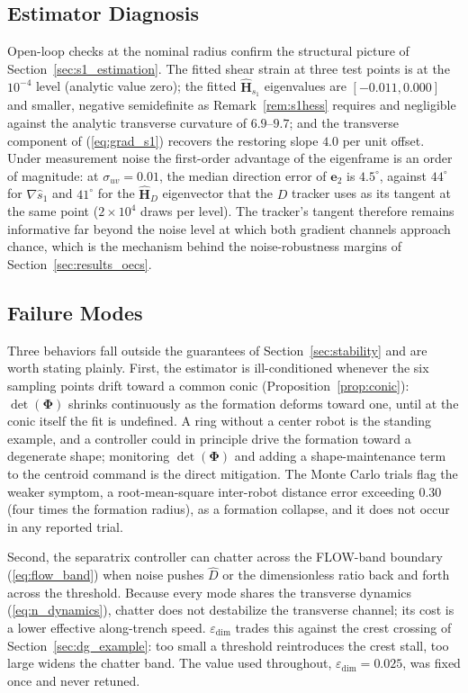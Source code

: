 \documentclass[lettersize,journal]{IEEEtran}
\begin{document}
\subsection{Estimator Diagnosis}
\label{sec:estimator_diagnosis}

Open-loop checks at the nominal radius confirm the structural picture
of Section~\ref{sec:s1_estimation}. The fitted shear strain at three
test points is at the $10^{-4}$ level (analytic value zero); the fitted
$\hat{\mathbf{H}}_{s_1}$ eigenvalues are $[-0.011, 0.000]$ and smaller,
negative semidefinite as Remark~\ref{rem:s1hess} requires and
negligible against the analytic transverse curvature of $6.9$--$9.7$;
and the transverse component of (\ref{eq:grad_s1}) recovers the
restoring slope $4.0$ per unit offset. Under measurement noise the
first-order advantage of the eigenframe is an order of magnitude: at
$\sigma_{uv} = 0.01$, the median direction error of $\mathbf{e}_2$ is
$4.5^\circ$, against $44^\circ$ for $\nabla\hat{s}_1$ and $41^\circ$
for the $\hat{\mathbf{H}}_D$ eigenvector that the $D$ tracker uses as its
tangent at the same point ($2\times 10^4$ draws per level). The
tracker's tangent therefore remains informative far beyond the noise
level at which both gradient channels approach chance, which is the
mechanism behind the noise-robustness margins of
Section~\ref{sec:results_oecs}.

\subsection{Failure Modes}

Three behaviors fall outside the guarantees of
Section~\ref{sec:stability} and are worth stating plainly. First, the
estimator is ill-conditioned whenever the six sampling points drift
toward a common conic (Proposition~\ref{prop:conic}):
$\det(\boldsymbol{\Phi})$ shrinks continuously as the formation
deforms toward one, until at the conic itself the fit is undefined. A
ring without a center robot is the standing example, and a controller
could in principle drive the formation toward a degenerate shape;
monitoring $\det(\boldsymbol{\Phi})$ and adding a shape-maintenance
term to the centroid command is the direct mitigation. The Monte Carlo
trials flag the weaker symptom, a root-mean-square inter-robot
distance error exceeding 0.30 (four times the formation radius), as a
formation collapse, and it does not occur in any reported trial.

Second, the separatrix controller can chatter across the FLOW-band
boundary (\ref{eq:flow_band}) when noise pushes $\hat{D}$ or the
dimensionless ratio back and forth across the threshold. Because every
mode shares the transverse dynamics (\ref{eq:n_dynamics}), chatter
does not destabilize the transverse channel; its cost is a lower
effective along-trench speed. $\varepsilon_{\text{dim}}$ trades this
against the crest crossing of Section~\ref{sec:dg_example}: too small
a threshold reintroduces the crest stall, too large widens the chatter
band. The value used throughout, $\varepsilon_{\text{dim}} = 0.025$,
was fixed once and never retuned.
\end{document}
